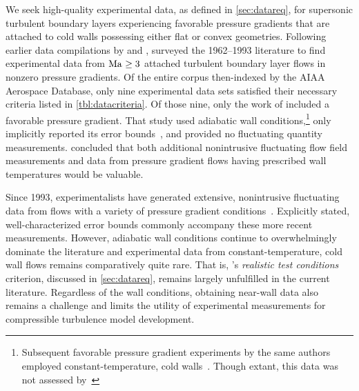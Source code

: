 We seek high-quality experimental data, as defined in \autoref{sec:datareq}, for
supersonic turbulent boundary layers experiencing favorable pressure gradients
that are attached to cold walls possessing either flat or convex geometries.
%
Following earlier data compilations by
\citet{Fernholz1977Critical,Fernholz1980Critical} and \citet{Fernholz1981Further},
\citet{Settles1993Hypersonic} surveyed the 1962--1993 literature to find
experimental data from $\mbox{Ma}_{} \geq{} 3$ attached turbulent boundary layer flows
in nonzero pressure gradients.  Of the entire corpus then-indexed by the AIAA Aerospace
Database, only nine experimental data sets satisfied their necessary criteria
listed in \autoref{tbl:datacriteria}.  Of those nine, only the work of
\citet{Lewis1972Experiment} included a favorable pressure gradient.  That study
used adiabatic wall conditions,\footnote{Subsequent favorable pressure gradient
experiments by the same authors employed
constant-temperature, cold walls~\citep{Gran1974Effect}.  Though extant, this data was not assessed
by~\citet{Settles1993Hypersonic}} only implicitly reported its error
bounds~\citep[][p.  7201-A-1]{Fernholz1977Critical}, and provided no fluctuating
quantity measurements.  \citeauthor{Settles1993Hypersonic} concluded that both
additional nonintrusive fluctuating flow field measurements and data from
pressure gradient flows having prescribed wall temperatures would be valuable.

Since 1993, experimentalists have generated extensive, nonintrusive
fluctuating data from flows with a variety of pressure gradient
conditions~\citep[e.g.][]{Bowersox1996Combined, Bowersox1996Turbulence,
Arnette1998Effects, Garg1998Measurements, Luker1998Experimental, Latin2000Flow,
Luker2000Influence, Ganapathisubramani2006Largescale, Ekoto2007Planar,
Ekoto2008Supersonic, Ekoto2009Response}.  Explicitly stated, well-characterized
error bounds commonly accompany these more recent measurements.  However,
adiabatic wall conditions continue to overwhelmingly dominate the literature and
experimental data from constant-temperature, cold wall flows remains
comparatively quite rare.  That is, \citeauthor{Settles1993Hypersonic}'s
\emph{realistic test conditions} criterion, discussed in
\autoref{sec:datareq}, remains largely unfulfilled in the current
literature.  Regardless of the wall conditions, obtaining near-wall data also
remains a challenge and limits the utility of experimental measurements for
compressible turbulence model development.

